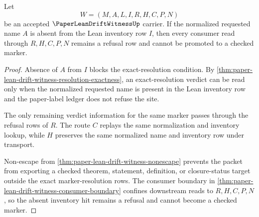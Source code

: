 \begin{theorem}
\label{thm:paper-lean-drift-witness-unresolved-marker-refusal}
Let
$$
W=(M,A,L,I,R,H,C,P,N)
$$
be an accepted $\PaperLeanDriftWitnessUp$ carrier. If the normalized requested name $A$ is absent from the Lean inventory row $I$, then every consumer read through $R,H,C,P,N$ remains a refusal row and cannot be promoted to a checked marker.
\end{theorem}
\begin{proof}
Absence of $A$ from $I$ blocks the exact-resolution condition. By \autoref{thm:paper-lean-drift-witness-resolution-exactness}, an exact-resolution verdict can be read only when the normalized requested name is present in the Lean inventory row and the paper-label ledger does not refuse the site.

The only remaining verdict information for the same marker passes through the refusal rows of $R$. The route $C$ replays the same normalization and inventory lookup, while $H$ preserves the same normalized name and inventory row under transport.

Non-escape from \autoref{thm:paper-lean-drift-witness-nonescape} prevents the packet from exporting a checked theorem, statement, definition, or closure-status target outside the exact marker-resolution rows. The consumer boundary in \autoref{thm:paper-lean-drift-witness-consumer-boundary} confines downstream reads to $R,H,C,P,N$, so the absent inventory hit remains a refusal and cannot become a checked marker.
\end{proof}

